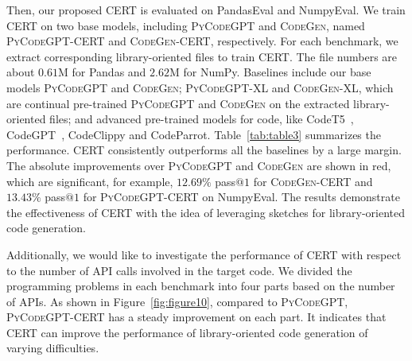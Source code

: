 \documentclass{article}
\newcommand{\cert}{\textsc{CERT}\xspace}
\newcommand{\peval}{PandasEval\xspace}
\newcommand{\neval}{NumpyEval\xspace}
\newcommand{\codepy}{\textsc{PyCodeGPT}\xspace}
\newcommand{\codepyxl}{\textsc{PyCodeGPT}-XL\xspace}
\newcommand{\codegen}{\textsc{CodeGen}\xspace}
\newcommand{\codegenxl}{\textsc{CodeGen}-XL\xspace}
\newcommand{\pandas}{Pandas\xspace}
\newcommand{\numpy}{NumPy\xspace}
\begin{document}
Then, our proposed \cert is evaluated on \peval and \neval. 
We train CERT on two base models, including \codepy and \codegen, named \codepy-\cert and \codegen-\cert, respectively.
For each benchmark, we extract corresponding library-oriented files to train \cert. The file numbers are about $0.61$M for \pandas and $2.62$M for \numpy.
Baselines include our base models \codepy and \codegen; \codepyxl and \codegenxl, which are continual pre-trained \codepy and \codegen on the extracted library-oriented files; and advanced pre-trained models for code, like  CodeT5~\cite{wang2021codet5}, CodeGPT~\cite{lu2021codexglue}, CodeClippy and CodeParrot. Table~\ref{tab:table3} summarizes the performance. \cert consistently outperforms all the baselines by a large margin. The absolute improvements over \codepy and \codegen are shown in red, which are significant, for example, $12.69\%$ pass$@1$ for \codegen-\cert and $13.43\%$ pass$@1$ for \codepy-\cert on \neval. 
The results demonstrate the effectiveness of \cert with the idea of leveraging sketches for library-oriented code generation.

Additionally, we would like to investigate the performance of \cert with respect to the number of API calls involved in the target code. We divided the programming problems in each benchmark into four parts based on the number of APIs. As shown in Figure~\ref{fig:figure10}, compared to \codepy, \codepy-\cert has a steady improvement on each part. It indicates that \cert can improve the performance of library-oriented code generation of varying difficulties.
\end{document}
